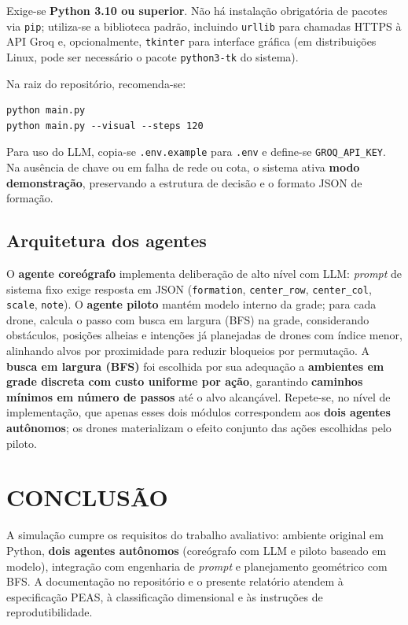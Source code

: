 \documentclass[12pt,a4paper,oneside]{article}
\begin{document}
Exige-se \textbf{Python 3.10 ou superior}. Não há instalação obrigatória de pacotes via \texttt{pip}; utiliza-se a biblioteca padrão, incluindo \texttt{urllib} para chamadas HTTPS à API Groq e, opcionalmente, \texttt{tkinter} para interface gráfica (em distribuições Linux, pode ser necessário o pacote \texttt{python3-tk} do sistema).

Na raiz do repositório, recomenda-se:

\begin{verbatim}
python main.py
python main.py --visual --steps 120
\end{verbatim}

Para uso do LLM, copia-se \texttt{.env.example} para \texttt{.env} e define-se \texttt{GROQ\_API\_KEY}. Na ausência de chave ou em falha de rede ou cota, o sistema ativa \textbf{modo demonstração}, preservando a estrutura de decisão e o formato JSON de formação.

\subsection{Arquitetura dos agentes}

O \textbf{agente coreógrafo} implementa deliberação de alto nível com LLM: \textit{prompt} de sistema fixo exige resposta em JSON (\texttt{formation}, \texttt{center\_row}, \texttt{center\_col}, \texttt{scale}, \texttt{note}). O \textbf{agente piloto} mantém modelo interno da grade; para cada drone, calcula o passo com busca em largura (BFS) na grade, considerando obstáculos, posições alheias e intenções já planejadas de drones com índice menor, alinhando alvos por proximidade para reduzir bloqueios por permutação. A \textbf{busca em largura (BFS)} foi escolhida por sua adequação a \textbf{ambientes em grade discreta com custo uniforme por ação}, garantindo \textbf{caminhos mínimos em número de passos} até o alvo alcançável. Repete-se, no nível de implementação, que apenas esses dois módulos correspondem aos \textbf{dois agentes autônomos}; os drones materializam o efeito conjunto das ações escolhidas pelo piloto.

\section{CONCLUSÃO}

A simulação cumpre os requisitos do trabalho avaliativo: ambiente original em Python, \textbf{dois agentes autônomos} (coreógrafo com LLM e piloto baseado em modelo), integração com engenharia de \textit{prompt} e planejamento geométrico com BFS. A documentação no repositório e o presente relatório atendem à especificação PEAS, à classificação dimensional e às instruções de reprodutibilidade.
\end{document}
